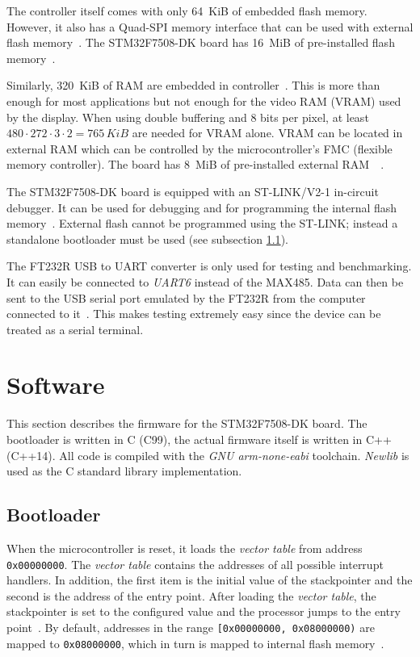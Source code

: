 The controller itself comes with only \SI{64}{KiB} of embedded flash memory. However, it also has a
Quad-SPI memory interface that can be used with external flash memory~\cite{mcu-datasheet}. The
STM32F7508-DK board has \SI{16}{MiB} of pre-installed flash memory~\cite{board-user-manual}.

Similarly, \SI{320}{KiB} of RAM are embedded in controller~\cite{mcu-datasheet}. This is more than
enough for most applications but not enough for the video RAM (VRAM) used by the display. When using
double buffering and 8 bits per pixel, at least $480 \cdot 272 \cdot 3 \cdot 2 = 765\,\si{KiB}$ are
needed for VRAM alone. VRAM can be located in external RAM which can be controlled by the microcontroller's
FMC (flexible memory controller). The board has \SI{8}{MiB} of pre-installed external RAM~\
\cite{mcu-datasheet}\cite{board-user-manual}.

The STM32F7508-DK board is equipped with an ST-LINK/V2-1 in-circuit debugger. It can be used for
debugging and for programming the internal flash memory~\cite{board-user-manual}. External flash
cannot be programmed using the ST-LINK; instead a standalone bootloader must be used (see subsection
\ref{implementation/software/bootloader}).

The FT232R USB to UART converter is only used for testing and benchmarking. It can easily be connected
to \textit{UART6} instead of the MAX485. Data can then be sent to the USB serial port emulated by
the FT232R from the computer connected to it~\cite{ftdi-232r-datasheet}. This makes testing extremely
easy since the device can be treated as a serial terminal.

\section{Software}
\label{implementation/software}

This section describes the firmware for the STM32F7508-DK board. The bootloader is written in C
(C99), the actual firmware itself is written in C++ (C++14). All code is compiled with the
\textit{GNU arm-none-eabi} toolchain. \textit{Newlib} is used as the C standard library implementation.

\subsection{Bootloader}
\label{implementation/software/bootloader}

When the microcontroller is reset, it loads the \textit{vector table} from address \mbox{\lstinline{0x00000000}.}
The \textit{vector table} contains the addresses of all possible interrupt handlers. In addition, the
first item is the initial value of the stackpointer and the second is the address of the entry point.
After loading the \textit{vector table}, the stackpointer is set to the configured value and the
processor jumps to the entry point~\cite{mcu-ref-manual}. By default, addresses in the range
\lstinline{[0x00000000, 0x08000000)} are mapped to \lstinline{0x08000000}, which in turn is mapped
to internal flash memory~\cite{mcu-ref-manual}.

